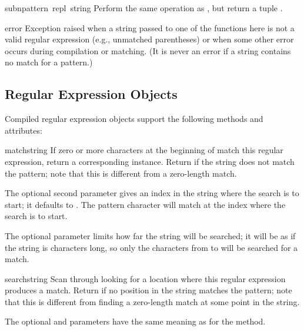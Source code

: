 \begin{funcdesc}{subn}{pattern\, repl\, string}
Perform the same operation as , but return a tuple
.
\end{funcdesc}

\begin{excdesc}{error}
  Exception raised when a string passed to one of the functions here
  is not a valid regular expression (e.g., unmatched parentheses) or
  when some other error occurs during compilation or matching.  (It is
  never an error if a string contains no match for a pattern.)
\end{excdesc}

\subsection{Regular Expression Objects}
Compiled regular expression objects support the following methods and
attributes:

\renewcommand{\indexsubitem}{(re method)}
\begin{funcdesc}{match}{string}
  If zero or more characters at the beginning of  match
  this regular expression, return a corresponding
   instance.  Return  if the string does not
  match the pattern; note that this is different from a zero-length
  match.
  
  The optional second parameter  gives an index in the string
  where the search is to start; it defaults to .  The
   pattern character will match at the index where the
  search is to start.

  The optional parameter  limits how far the string will
  be searched; it will be as if the string is  characters
  long, so only the characters from  to  will be
  searched for a match.
\end{funcdesc}

\begin{funcdesc}{search}{string}
  Scan through  looking for a location where this regular
  expression produces a match.  Return  if no
  position in the string matches the pattern; note that this is
  different from finding a zero-length match at some point in the string.
  
  The optional  and  parameters have the same
  meaning as for the  method.
\end{funcdesc}

